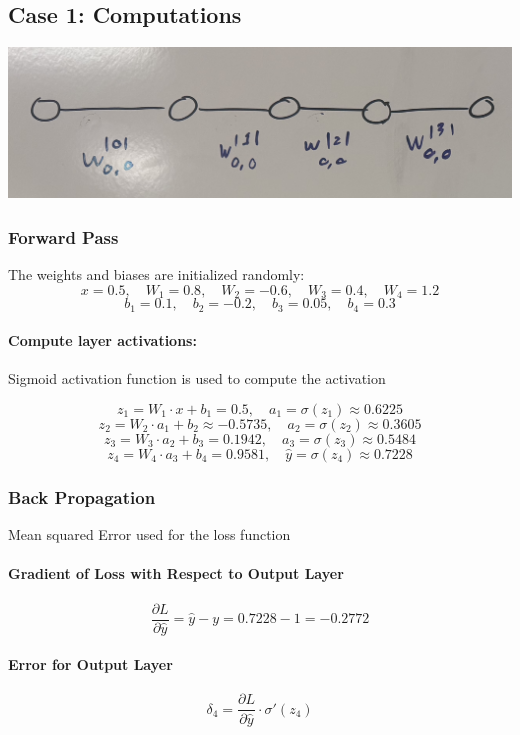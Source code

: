 \documentclass{article}
\begin{document}
\subsection{Case 1: Computations}
\includegraphics[scale=0.1]{../figs/Case 1.png} \\[0.5cm]

\subsubsection{Forward Pass}
The weights and biases are initialized randomly:
\[
x = 0.5, \quad W_1 = 0.8, \quad W_2 = -0.6, \quad W_3 = 0.4, \quad W_4 = 1.2
\]
\[
b_1 = 0.1, \quad b_2 = -0.2, \quad b_3 = 0.05, \quad b_4 = 0.3
\]
\paragraph{Compute layer activations:} Sigmoid activation function is used to compute the activation

\[
z_1 = W_1 \cdot x + b_1 = 0.5, \quad a_1 = \sigma(z_1) \approx 0.6225
\]
\[
z_2 = W_2 \cdot a_1 + b_2 \approx -0.5735, \quad a_2 = \sigma(z_2) \approx 0.3605
\]
\[
z_3 = W_3 \cdot a_2 + b_3 = 0.1942, \quad a_3 = \sigma(z_3) \approx 0.5484
\]
\[
z_4 = W_4 \cdot a_3 + b_4 = 0.9581, \quad \hat{y} = \sigma(z_4) \approx 0.7228
\]

\subsubsection{Back Propagation} Mean squared Error used for the loss function


\paragraph{Gradient of Loss with Respect to Output Layer}

\[
\frac{\partial L}{\partial \hat{y}} = \hat{y} - y = 0.7228 - 1 = -0.2772
\]

\paragraph{Error for Output Layer}
\[
\delta_4 = \frac{\partial L}{\partial \hat{y}} \cdot \sigma'(z_4)
\]
\end{document}
